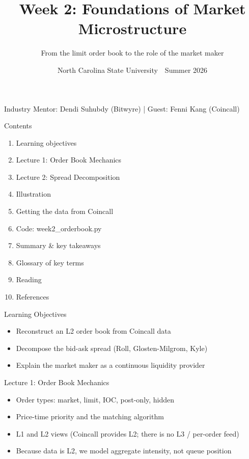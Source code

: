 \documentclass[aspectratio=169,10pt]{beamer}
\title{Week 2: Foundations of Market Microstructure}
\subtitle{From the limit order book to the role of the market maker}
\date{North Carolina State University \,\textbar\, Summer 2026}
\begin{document}
\begin{frame}[plain]\titlepage\begin{center}\tiny Industry Mentor: Dendi Suhubdy (Bitwyre)  |  Guest: Fenni Kang (Coincall)\end{center}\end{frame}
\begin{frame}{Contents}
\small\begin{enumerate}\setlength{\itemsep}{3pt}
  \item Learning objectives
  \item Lecture 1: Order Book Mechanics
  \item Lecture 2: Spread Decomposition
  \item Illustration
  \item Getting the data from Coincall
  \item Code: week2\_orderbook.py
  \item Summary \& key takeaways
  \item Glossary of key terms
  \item Reading
  \item References
\end{enumerate}
\end{frame}

\begin{frame}{Learning Objectives}
\begin{itemize}
  \item Reconstruct an L2 order book from Coincall data
  \item Decompose the bid-ask spread (Roll, Glosten-Milgrom, Kyle)
  \item Explain the market maker as a continuous liquidity provider
\end{itemize}
\end{frame}

\begin{frame}{Lecture 1: Order Book Mechanics}
\begin{itemize}
  \item Order types: market, limit, IOC, post-only, hidden
  \item Price-time priority and the matching algorithm
  \item L1 and L2 views (Coincall provides L2; there is no L3 / per-order feed)
  \item Because data is L2, we model aggregate intensity, not queue position
\end{itemize}
\end{frame}
\end{document}
